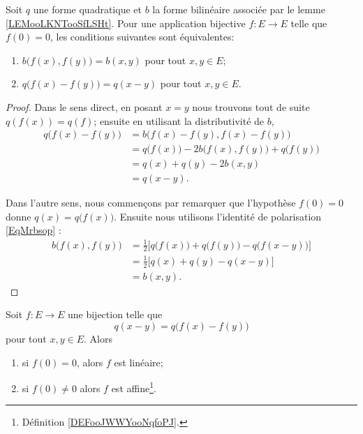 \begin{lemma}   \label{LemewGJmM}
    Soit \( q\) une forme quadratique et \( b\) la forme bilinéaire associée par le lemme \ref{LEMooLKNTooSfLSHt}.  Pour une application bijective \( f\colon E\to E\) telle que \( f(0)=0\), les conditions suivantes sont équivalentes: 
    \begin{enumerate}
        \item
            \( b\big( f(x),f(y) \big)=b(x,y)\) pour tout \( x,y\in E\);
        \item
            \( q\big( f(x)-f(y) \big)=q(x-y)\) pour tout \( x,y\in E\).
    \end{enumerate}
\end{lemma}

\begin{proof}
    Dans le sens direct, en posant \( x=y\) nous trouvons tout de suite \( q(f(x))=q(f)\); ensuite en utilisant la distributivité de \( b\),
    \begin{subequations}
        \begin{align}
            q\big( f(x)-f(y) \big)&=b\big( f(x)-f(y),f(x)-f(y) \big)\\
            &=q\big( f(x) \big)-2b\big( f(x),f(y) \big)+q\big( f(y) \big)\\
            &=q(x)+q(y)-2b(x,y)\\
            &=q(x-y).
        \end{align}
    \end{subequations}
    
    Dans l'autre sens, nous commençons par remarquer que l'hypothèse \( f(0)=0\) donne \( q(x)=q\big( f(x) \big)\). Ensuite nous utilisons l'identité de polarisation \eqref{EqMrbsop} :
    \begin{subequations}
        \begin{align}
            b\big( f(x),f(y) \big)&=\frac{ 1 }{2}\big[ q\big( f(x) \big)+q\big( f(y) \big)-q\big( f(x-y) \big) \big]\\
            &=\frac{ 1 }{2}\big[ q(x)+q(y)-q(x-y) \big]\\
            &=b(x,y).
        \end{align}
    \end{subequations}
\end{proof}

\begin{theorem}     \label{ThoDsFErq}
    Soit \( f\colon E\to E\) une bijection telle que
    \begin{equation}
        q(x-y)=q\big( f(x)-f(y) \big)
    \end{equation}
    pour tout \( x,y\in E\). Alors
    \begin{enumerate}
        \item
            si \( f(0)=0\), alors \( f\) est linéaire;
        \item
            si \( f(0)\neq 0\) alors \( f\) est affine\footnote{Définition \ref{DEFooJWWYooNqfoPJ}.}.
    \end{enumerate}
\end{theorem}

